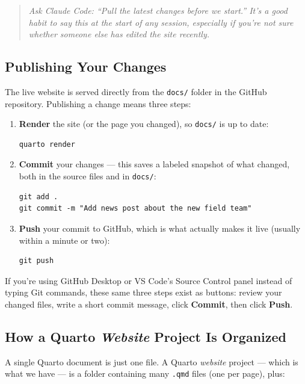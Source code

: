 \documentclass[11pt]{article}
\newcommand{\term}[1]{\textbf{#1}}
\newcommand{\file}[1]{\texttt{#1}}
\begin{document}
\begin{quote}
\textit{Ask Claude Code: ``Pull the latest changes before we start.''
It's a good habit to say this at the start of any session, especially
if you're not sure whether someone else has edited the site recently.}
\end{quote}

\subsection{Publishing Your Changes}
\label{sec:publish}

The live website is served directly from the \file{docs/} folder in the
GitHub repository. Publishing a change means three steps:

\begin{enumerate}
    \item \term{Render} the site (or the page you changed), so
    \file{docs/} is up to date:
\begin{lstlisting}
quarto render
\end{lstlisting}
    \item \term{Commit} your changes --- this saves a labeled snapshot of
    what changed, both in the source files and in \file{docs/}:
\begin{lstlisting}
git add .
git commit -m "Add news post about the new field team"
\end{lstlisting}
    \item \term{Push} your commit to GitHub, which is what actually makes
    it live (usually within a minute or two):
\begin{lstlisting}
git push
\end{lstlisting}
\end{enumerate}

If you're using GitHub Desktop or VS Code's Source Control panel instead
of typing Git commands, these same three steps exist as buttons: review
your changed files, write a short commit message, click \term{Commit},
then click \term{Push}.

\subsection{How a Quarto \emph{Website} Project Is Organized}

A single Quarto document is just one file. A Quarto \emph{website} project
--- which is what we have --- is a folder containing many \file{.qmd}
files (one per page), plus:
\end{document}

